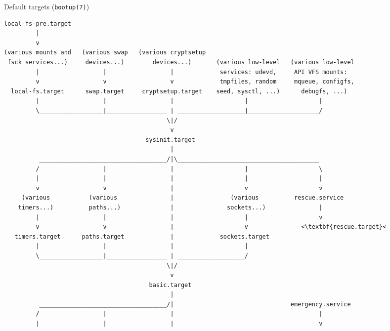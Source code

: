 \documentclass[11pt,final,usepdftitle=false]{beamer}
\begin{document}
\begin{frame}[fragile]{Default targets (\texttt{bootup(7)})}
\begin{center}
\begin{adjustbox}{height=0.45\textheight,keepaspectratio}
\begin{lstlisting}[basicstyle=\ttfamily\tiny,escapeinside={<<}]
local-fs-pre.target
         |
         v
(various mounts and   (various swap   (various cryptsetup
 fsck services...)     devices...)        devices...)       (various low-level   (various low-level
         |                  |                  |             services: udevd,     API VFS mounts:
         v                  v                  v             tmpfiles, random     mqueue, configfs,
  local-fs.target      swap.target     cryptsetup.target    seed, sysctl, ...)      debugfs, ...)
         |                  |                  |                    |                    |
         \__________________|_________________ | ___________________|____________________/
                                              \|/
                                               v
                                        sysinit.target
                                               |
          ____________________________________/|\________________________________________
         /                  |                  |                    |                    \
         |                  |                  |                    |                    |
         v                  v                  |                    v                    v
     (various           (various               |                (various          rescue.service
    timers...)          paths...)              |               sockets...)               |
         |                  |                  |                    |                    v
         v                  v                  |                    v               <\textbf{rescue.target}<
   timers.target      paths.target             |             sockets.target
         |                  |                  |                    |
         \__________________|_________________ | ___________________/
                                              \|/
                                               v
                                         basic.target
                                               |
          ____________________________________/|                                 emergency.service
         /                  |                  |                                         |
         |                  |                  |                                         v

\end{lstlisting}
\end{adjustbox}
\end{center}
\end{frame}
\end{document}
